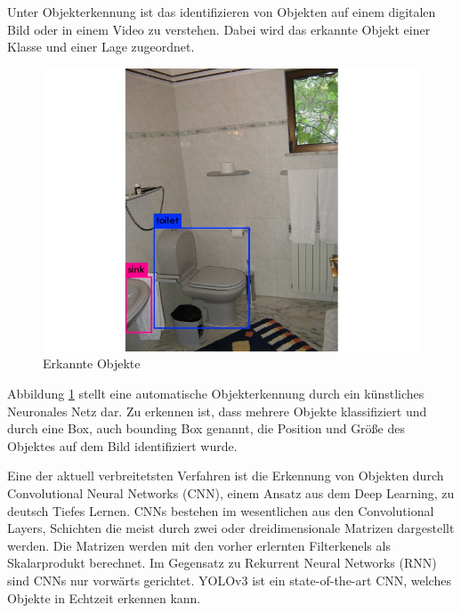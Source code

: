 Unter Objekterkennung ist das identifizieren von Objekten auf einem digitalen Bild oder in einem Video zu verstehen. Dabei wird das erkannte Objekt einer Klasse und einer Lage zugeordnet. 

\begin{figure}[h]
	
	\begin{center}
		
		\includegraphics[width=14cm]{images/Bad.jpg}
		
		\caption{Erkannte Objekte}
		
		\label{bad_Bild}
		
	\end{center}
	
	
\end{figure}





Abbildung \ref{bad_Bild} stellt eine automatische Objekterkennung durch ein künstliches Neuronales Netz dar. Zu erkennen ist, dass mehrere Objekte klassifiziert und durch eine Box, auch bounding Box genannt, die Position und Größe des Objektes auf dem Bild identifiziert wurde. 

Eine der aktuell verbreitetsten Verfahren ist die Erkennung von Objekten durch Convolutional Neural Networks (CNN), einem Ansatz aus dem Deep Learning, zu deutsch Tiefes Lernen. CNNs bestehen im wesentlichen aus den Convolutional Layers, Schichten die meist durch zwei oder dreidimensionale Matrizen dargestellt werden. Die Matrizen werden mit den vorher erlernten Filterkenels als Skalarprodukt berechnet. Im Gegensatz zu Rekurrent Neural Networks (RNN) sind CNNs nur vorwärts gerichtet. YOLOv3 ist ein state-of-the-art CNN, welches Objekte in Echtzeit erkennen kann.  





